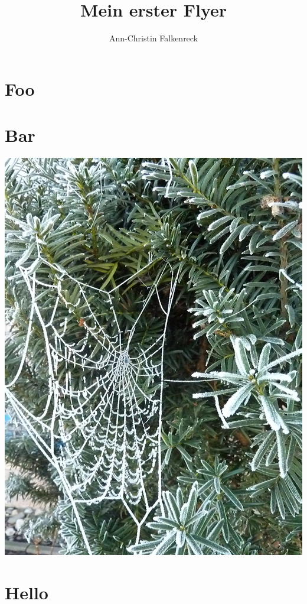 \documentclass[12pt,ngerman]{leaflet}
\author{Ann-Christin Falkenreck}
\title{Mein erster Flyer}
\begin{document}
\maketitle
\thispagestyle{empty}

\section{Foo}

\blindtext[2]

\section{Bar}

\includegraphics[width=\textwidth]{Bilder/Herbst}

\blindtext

\section{Hello}
\end{document}
